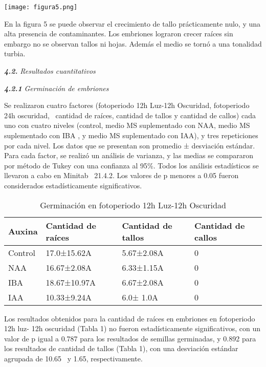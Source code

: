 \documentclass{article}
\newenvironment{Figure}
  {\par\medskip\noindent\minipage{\linewidth}}
  {\endminipage\par\medskip}
\begin{document}
\begin{multicols}{2}
\begin{Figure}
    \centering
    \texttt{[image: figura5.png]}
\end{Figure}

En la figura 5 se puede observar el crecimiento de tallo prácticamente nulo, y una alta presencia de contaminantes. Los embriones lograron crecer raíces sin embargo no se observan tallos ni hojas. Además el medio se tornó a una tonalidad turbia. 

\textit{\textbf{4.2.}}\textit{ Resultados cuantitativos}

\textit{\textbf{4.2.1 }}\textit{Germinación de embriones}

Se realizaron cuatro factores (fotoperiodo 12h Luz-12h Oscuridad, fotoperiodo 24h oscuridad,  cantidad de raíces, cantidad de tallos y cantidad de callos) cada uno con cuatro niveles (control, medio MS suplementado con NAA, medio MS suplementado con IBA , y medio MS suplementado con IAA), y tres repeticiones por cada nivel. Los datos que se presentan son promedio ± desviación estándar. Para cada factor, se realizó un análisis de varianza, y las medias se compararon por método de Tukey con una confianza al 95\%. Todos los análisis estadísticos se llevaron a cabo en Minitab  21.4.2. Los valores de p menores a 0.05 fueron considerados estadísticamente significativos. 


\begin{table*}[ht]
\centering
\begin{tabularx}{\textwidth}{ | X | X | X | X | }
\toprule
\rowcolor[HTML]{EFEFEF} 
Auxina  & Cantidad de raíces & Cantidad de tallos & Cantidad de callos \\ \midrule
Control & 17.0±15.62A        & 5.67±2.08A         & 0                  \\ \midrule
NAA     & 16.67±2.08A        & 6.33±1.15A         & 0                  \\ \midrule
IBA     & 18.67±10.97A       & 6.67±2.08A         & 0                  \\ \midrule
IAA     & 10.33±9.24A        & 6.0± 1.0A          & 0                  \\ \bottomrule
\end{tabularx}
\caption{Germinación en fotoperiodo 12h Luz-12h Oscuridad}
\end{table*}

    
Los resultados obtenidos para la cantidad de raíces en embriones en fotoperiodo 12h luz- 12h oscuridad (Tabla 1) no fueron estadísticamente significativos, con un valor de p igual a 0.787 para los resultados de semillas germinadas, y 0.892 para los resultados de cantidad de tallos (Tabla 1), con una desviación estándar agrupada de 10.65  y 1.65, respectivamente. 



\end{multicols}
\end{document}
